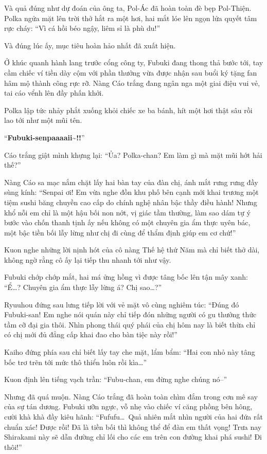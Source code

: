 \documentclass[../main.tex]{subfiles}
\begin{document}
Và quả đúng như dự đoán của ông ta, Pol-Ác đã hoàn toàn đè bẹp Pol-Thiện. Polka ngửa mặt lên trời thở hắt ra một hơi, hai mắt lóe lên ngọn lửa quyết tâm rực cháy: ``Vì cá hồi béo ngậy, liêm sỉ là phù du!''

Và đúng lúc ấy, mục tiêu hoàn hảo nhất đã xuất hiện.

Ở khúc quanh hành lang trước cổng công ty, Fubuki đang thong thả bước tới, tay cầm chiếc ví tiền dày cộm với phần thưởng vừa được nhận sau buổi ký tặng fan hâm mộ thành công rực rỡ. Nàng Cáo trắng đang ngân nga một giai điệu vui vẻ, tai cáo vểnh lên đầy phấn khởi.

Polka lập tức nhảy phắt xuống khỏi chiếc xe ba bánh, hít một hơi thật sâu rồi lao tới như một mũi tên.

``\textbf{Fubuki-senpaaaaii\~{}!!}''

Cáo trắng giật mình khựng lại: ``Ủa? Polka-chan? Em làm gì mà mặt mũi hớt hải thế?''

Nàng Cáo sa mạc nắm chặt lấy hai bàn tay của đàn chị, ánh mắt rưng rưng đầy sùng kính: ``Senpai ơi! Em vừa nghe đồn khu phố bên cạnh mới khai trương một tiệm sushi băng chuyền cao cấp do chính nghệ nhân bậc thầy điều hành! Nhưng khổ nỗi em chỉ là một hậu bối non nớt, vị giác tầm thường, làm sao dám tự ý bước vào chốn thanh tịnh ấy nếu không có một chuyên gia ẩm thực uyên bác, một bậc tiền bối lẫy lừng như chị đi cùng để thẩm định giúp em cơ chứ!''

Kuon nghe những lời nịnh hót của cô nàng Thế hệ thứ Năm mà chỉ biết thở dài, không ngờ rằng cô ấy lại tiếp thu nhanh tới như vậy.

Fubuki chớp chớp mắt, hai má ửng hồng vì được tâng bốc lên tận mây xanh: ``Ể\dots? Chuyên gia ẩm thực lẫy lừng á? Chị sao\dots?''

Ryuuhou đứng sau lưng tiếp lời với vẻ mặt vô cùng nghiêm túc: ``Đúng đó Fubuki-san! Em nghe nói quán này chỉ tiếp đón những người có gu thưởng thức tầm cỡ đại gia thôi. Nhìn phong thái quý phái của chị hôm nay là biết thừa chỉ có chị mới đủ đẳng cấp khai đao cho bàn tiệc này rồi!''

Kaiho đứng phía sau chỉ biết lấy tay che mặt, lẩm bẩm: ``Hai con nhỏ này tâng bốc trơ trẽn tới mức thô thiển luôn rồi kìa\dots''

Kuon định lên tiếng vạch trần: ``Fubu-chan, em đừng nghe chúng nó--''

Nhưng đã quá muộn. Nàng Cáo trắng đã hoàn toàn chìm đắm trong cơn mê say của sự tán dương. Fubuki ưỡn ngực, vỗ nhẹ vào chiếc ví căng phồng bên hông, cười khà khà đầy kiêu hãnh: ``Fufufu\dots\ Quả nhiên mắt nhìn người của hai đứa rất chuẩn xác! Được rồi! Đã là tiền bối thì không thể để đàn em thất vọng! Trưa nay Shirakami này sẽ dẫn đường chỉ lối cho các em trên con đường khai phá sushi! Đi thôi!''
\end{document}
